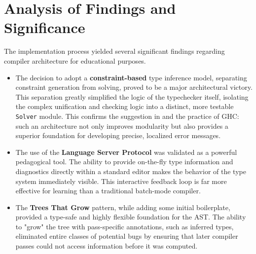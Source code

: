 \section{Analysis of Findings and Significance}
The implementation process yielded several significant findings regarding compiler architecture for educational purposes.
\begin{itemize}
    \item The decision to adopt a \textbf{constraint-based} type inference model, separating constraint generation from solving, proved to be a major architectural victory. This separation greatly simplified the logic of the typechecker itself, isolating the complex unification and checking logic into a distinct, more testable \texttt{Solver} module. This confirms the suggestion in \cite{jones-practical-2007} and the practice of GHC: such an architecture not only improves modularity but also provides a superior foundation for developing precise, localized error messages.
    \item The use of the \textbf{Language Server Protocol} was validated as a powerful pedagogical tool. The ability to provide on-the-fly type information and diagnostics directly within a standard editor makes the behavior of the type system immediately visible. This interactive feedback loop is far more effective for learning than a traditional batch-mode compiler.
    \item The \textbf{Trees That Grow} pattern, while adding some initial boilerplate, provided a type-safe and highly flexible foundation for the AST. The ability to "grow" the tree with pass-specific annotations, such as inferred types, eliminated entire classes of potential bugs by ensuring that later compiler passes could not access information before it was computed.
\end{itemize}

